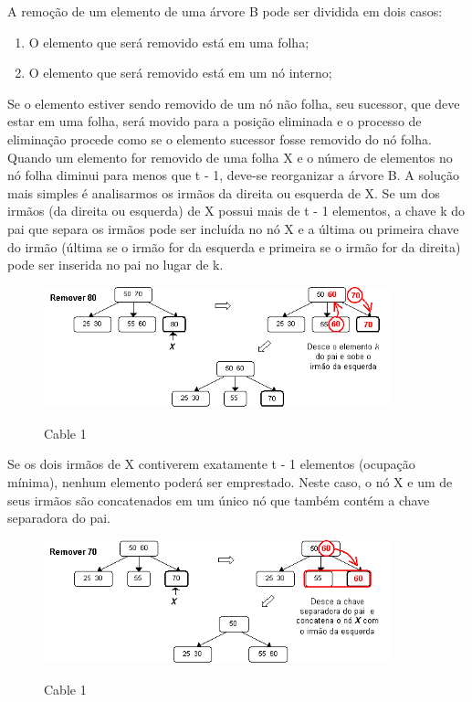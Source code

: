 \documentclass{article}
\begin{document}
A remoção de um elemento de uma árvore B pode ser dividida em dois casos:

\begin{enumerate}
   \item O elemento que será removido está em uma folha;
   \item O elemento que será removido está em um nó interno;
\end{enumerate}

Se o elemento estiver sendo removido de um nó não folha, seu sucessor, que deve estar em uma
folha, será movido para a posição eliminada e o processo de eliminação procede como se o elemento
sucessor fosse removido do nó folha.\\
Quando um elemento for removido de uma folha X e o número de elementos no nó folha diminui para
menos que t - 1, deve-se reorganizar a árvore B. A solução mais simples é analisarmos os irmãos da
direita ou esquerda de X. Se um dos irmãos (da direita ou esquerda) de X possui mais de t - 1
elementos, a chave k do pai que separa os irmãos pode ser incluída no nó X e a última ou primeira
chave do irmão (última se o irmão for da esquerda e primeira se o irmão for da direita) pode ser
inserida no pai no lugar de k.

\begin{figure}[h]
    \center
    \includegraphics[width=10cm]{imagens/arvb5.png}
    \label{cable}
    \caption{Cable 1}
\end{figure}

Se os dois irmãos de X contiverem exatamente t - 1 elementos (ocupação mínima), nenhum elemento
poderá ser emprestado. Neste caso, o nó X e um de seus irmãos são concatenados em um único nó que
também contém a chave separadora do pai.

\begin{figure}[h]
    \center
    \includegraphics[width=10cm]{imagens/arvb6.png}
    \label{cable}
    \caption{Cable 1}
\end{figure}
\end{document}
